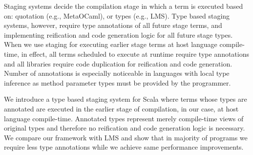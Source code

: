 Staging systems decide the compilation stage in which a term is executed based on: quotation (e.g., MetaOCaml), or types (e.g., LMS). Type based staging systems, however, require type annotations of all future stage terms, and implementing reification and code generation logic for all future stage types. When we use staging for executing earlier stage terms at host language compile-time, in effect, all terms scheduled to execute at runtime require type annotations and all libraries require code duplication for reification and code generation. Number of annotations is especially noticeable in languages with local type inference as method parameter types must be provided by the programmer.

We introduce a type based staging system for Scala where terms whose types are annotated are executed in the earlier stage of compilation, in our case, at host language compile-time. Annotated types represent merely compile-time views of original types and therefore no reification and code generation logic is necessary. We compare our framework with LMS and show that in majority of programs we require less type annotations while we achieve same performance improvements.

